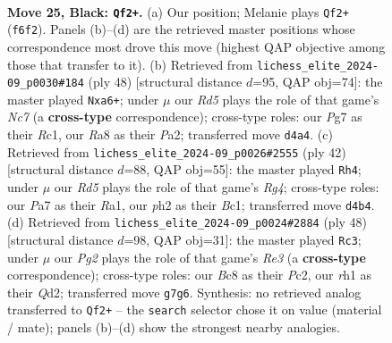 \documentclass[11pt]{article}
\begin{document}
\clearpage

\begin{figure}[p]\centering
\begin{subfigure}{0.46\textwidth}\centering
\resizebox{\linewidth}{!}{%
\newchessgame
\chessboard[
  setfen={r1b2k2/pp3pp1/n3pq2/3p4/3r4/PPQ5/2K3PP/R5NR b - - 1 25},
  showmover=false,
  pgfstyle=straightmove, color=movearrow, markmove={f6-f2}
]}
\caption{}
\end{subfigure}\hfill
\begin{subfigure}{0.46\textwidth}\centering
\resizebox{\linewidth}{!}{%
\newchessgame
\chessboard[
  setfen={1kr2bnr/1pN3pp/p7/3Pp3/4P1q1/1P3R2/P1Q1KP2/2R5 w - - 0 25},
  showmover=false,
  pgfstyle=straightmove, color=movearrow, markmove={c7-a6}
]}
\caption{}
\end{subfigure}
\\[4pt]
\begin{subfigure}{0.46\textwidth}\centering
\resizebox{\linewidth}{!}{%
\newchessgame
\chessboard[
  setfen={2r4k/pp4p1/8/2bp1r1q/6R1/2N1P1P1/PP2Q2P/R1B3K1 w - - 1 22},
  showmover=false,
  pgfstyle=straightmove, color=movearrow, markmove={g4-h4}
]}
\caption{}
\end{subfigure}\hfill
\begin{subfigure}{0.46\textwidth}\centering
\resizebox{\linewidth}{!}{%
\newchessgame
\chessboard[
  setfen={1kn5/2pr1bp1/p4p1p/2qp4/3N4/1P2R1B1/P1PQ1PPP/1K6 w - - 1 25},
  showmover=false,
  pgfstyle=straightmove, color=movearrow, markmove={e3-c3}
]}
\caption{}
\end{subfigure}
\caption{\textbf{Move 25, Black: \texttt{Qf2+}.} (a) Our position; Melanie plays \texttt{Qf2+} (\texttt{f6f2}). Panels (b)--(d) are the retrieved master positions whose correspondence most drove this move (highest QAP objective among those that transfer to it). (b) Retrieved from \texttt{lichess\_elite\_2024-09\_p0030\#184} (ply 48) [structural distance $d$=95, QAP obj=74]: the master played \texttt{Nxa6+}; under $\mu$ our \emph{Rd5} plays the role of that game's \emph{Nc7} (a \textbf{cross-type} correspondence); cross-type roles: our \emph{P}g7 as their \emph{R}c1, our \emph{R}a8 as their \emph{P}a2; transferred move \texttt{d4a4}. (c) Retrieved from \texttt{lichess\_elite\_2024-09\_p0026\#2555} (ply 42) [structural distance $d$=88, QAP obj=55]: the master played \texttt{Rh4}; under $\mu$ our \emph{Rd5} plays the role of that game's \emph{Rg4}; cross-type roles: our \emph{P}a7 as their \emph{R}a1, our \emph{p}h2 as their \emph{B}c1; transferred move \texttt{d4b4}. (d) Retrieved from \texttt{lichess\_elite\_2024-09\_p0024\#2884} (ply 48) [structural distance $d$=98, QAP obj=31]: the master played \texttt{Rc3}; under $\mu$ our \emph{Pg2} plays the role of that game's \emph{Re3} (a \textbf{cross-type} correspondence); cross-type roles: our \emph{B}c8 as their \emph{P}c2, our \emph{r}h1 as their \emph{Q}d2; transferred move \texttt{g7g6}. Synthesis: no retrieved analog transferred to \texttt{Qf2+} -- the \texttt{search} selector chose it on value (material / mate); panels (b)--(d) show the strongest nearby analogies.}
\label{fig:thought-m49}
\end{figure}
\end{document}
